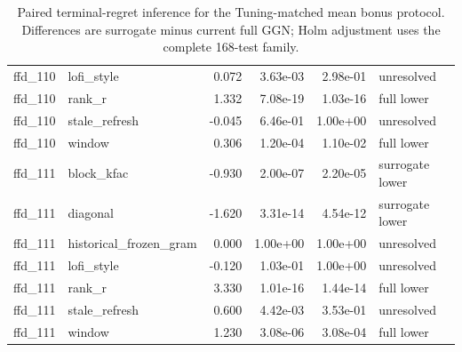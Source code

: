 \begin{table}[p]
\begin{tabular}{llrrrl}
ffd\_110 & lofi\_style & 0.072 & 3.63e-03 & 2.98e-01 & unresolved \\
ffd\_110 & rank\_r & 1.332 & 7.08e-19 & 1.03e-16 & full lower \\
ffd\_110 & stale\_refresh & -0.045 & 6.46e-01 & 1.00e+00 & unresolved \\
ffd\_110 & window & 0.306 & 1.20e-04 & 1.10e-02 & full lower \\
ffd\_111 & block\_kfac & -0.930 & 2.00e-07 & 2.20e-05 & surrogate lower \\
ffd\_111 & diagonal & -1.620 & 3.31e-14 & 4.54e-12 & surrogate lower \\
ffd\_111 & historical\_frozen\_gram & 0.000 & 1.00e+00 & 1.00e+00 & unresolved \\
ffd\_111 & lofi\_style & -0.120 & 1.03e-01 & 1.00e+00 & unresolved \\
ffd\_111 & rank\_r & 3.330 & 1.01e-16 & 1.44e-14 & full lower \\
ffd\_111 & stale\_refresh & 0.600 & 4.42e-03 & 3.53e-01 & unresolved \\
ffd\_111 & window & 1.230 & 3.08e-06 & 3.08e-04 & full lower \\
\bottomrule
\end{tabular}
\caption{Paired terminal-regret inference for the Tuning-matched mean bonus protocol. Differences are surrogate minus current full GGN; Holm adjustment uses the complete 168-test family.}
\label{tab:coverage-matched-comparisons-3}
\end{table}
